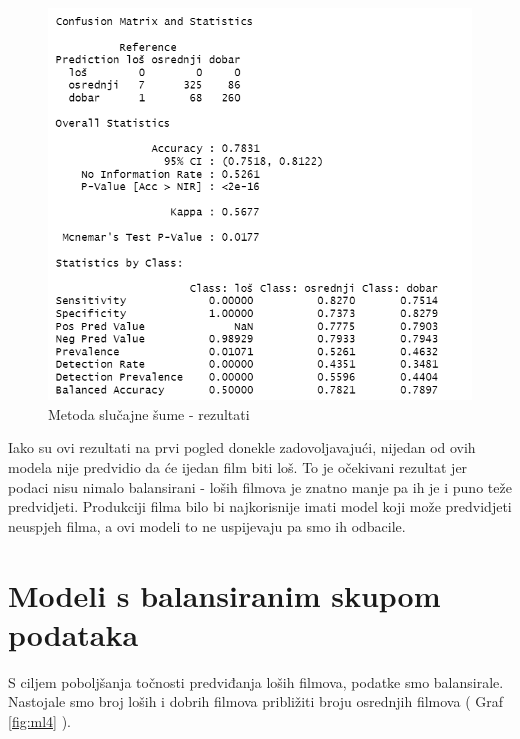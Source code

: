 \begin{figure}[H]
	\centering
	\includegraphics[width=15cm]{../figures/expl/003.png}
	\caption{Metoda slučajne šume - rezultati}
	\label{fig:ml3}
\end{figure}

Iako su ovi rezultati na prvi pogled donekle zadovoljavajući, nijedan od ovih modela nije predvidio da će ijedan film biti loš. To je očekivani rezultat jer podaci nisu nimalo balansirani - loših filmova je znatno manje pa ih je i puno teže predvidjeti. Produkciji filma bilo bi najkorisnije imati model koji može predvidjeti neuspjeh filma, a ovi modeli to ne uspijevaju pa smo ih odbacile.

\section{Modeli s balansiranim skupom podataka}

S ciljem poboljšanja točnosti predviđanja loših filmova, podatke smo balansirale. Nastojale smo broj loših i dobrih filmova približiti broju osrednjih filmova ( Graf \ref{fig:ml4} ).



